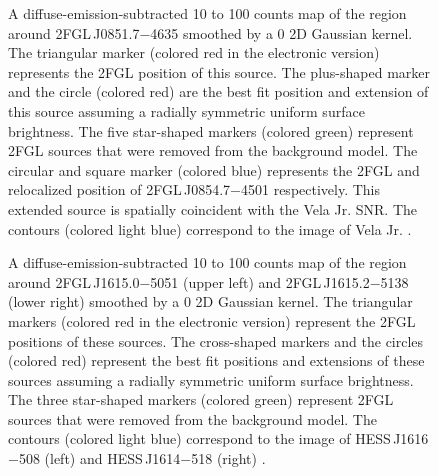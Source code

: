 \documentclass[12pt,preprint]{aastex}
\newif\ifcolorfigure
\newcommand{\gev}{\text{GeV}\xspace}
\newcommand{\tev}{\text{TeV}\xspace}
\begin{document}
\begin{figure}
    \ifcolorfigure
      \plotone{source_plots/source_Vela_Jr_color.eps}
    \else
    \fi
  \caption{A diffuse-emission-subtracted 10 \gev to 100 \gev counts map of
  the region around 2FGL\,J0851.7$-$4635 smoothed by a 0 2D Gaussian
  kernel. The triangular marker (colored red in the electronic version)
  represents the 2FGL position of this source.  The plus-shaped marker
  and the circle (colored red) are the best fit position and extension of
  this source assuming a radially symmetric uniform surface brightness.
  The five star-shaped markers (colored green) represent 2FGL sources
  that were removed from the background model.  The circular and square
  marker (colored blue) represents the 2FGL and relocalized position of
  2FGL\,J0854.7$-$4501 respectively.  This extended source is spatially
  coincident with the Vela Jr. SNR.  The contours (colored light blue)
  correspond to the \tev image of Vela Jr.
  \citep{vela_jr_hess}.
  }\label{Vela_Jr}
\end{figure}

\begin{figure}
    \ifcolorfigure
      \plotone{source_plots/source_HESS_J1614-518_color.eps}
    \else
    \fi
  \caption{
    A diffuse-emission-subtracted 10 \gev to 100 \gev counts
    map of the region around 2FGL\,J1615.0$-$5051 (upper left)
    and 2FGL\,J1615.2$-$5138 (lower right) smoothed by a 0
    2D Gaussian kernel.  The triangular markers (colored red in the
    electronic version) represent the 2FGL positions of these sources.
    The cross-shaped markers and the
    circles (colored red) represent the best fit
    positions and extensions of these sources assuming a radially
    symmetric uniform surface brightness.  The three star-shaped
    markers (colored
    green) represent 2FGL sources that were removed from the background
    model.  The contours (colored light blue) correspond to the \tev
    image of HESS\,J1616$-$508 (left) and HESS\,J1614$-$518 (right)
    \citep{hess_plane_survey}.   
    }\label{1FGL_J1613.6-5100c}
\end{figure}
\end{document}
